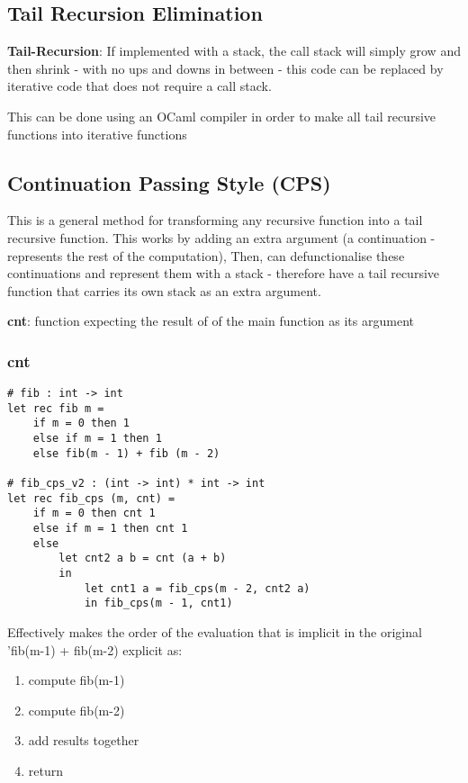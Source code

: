\documentclass{article}
\newenvironment{definition}{\par\color{blue}}{\par}
\begin{document}
\subsection{Tail Recursion Elimination}
\begin{definition}
	\textbf{Tail-Recursion}: If implemented with a stack, the call stack will simply grow and then shrink - with no ups and downs in between - this code can be replaced by iterative code that does not require a call stack. 
	
	This can be done using an OCaml compiler in order to make all tail recursive functions into iterative functions
\end{definition}
\subsection{Continuation Passing Style (CPS)}
This is a general method for transforming any recursive function into a tail recursive function. This works by adding an extra argument (a continuation - represents the rest of the computation), Then, can defunctionalise these continuations and represent them with a stack - therefore have a tail recursive function that carries its own stack as an extra argument.

\bigskip
\noindent
\textbf{cnt}: function expecting the result of of the main function as its argument

\subsubsection{cnt}
\begin{lstlisting}
# fib : int -> int 
let rec fib m = 
	if m = 0 then 1
	else if m = 1 then 1
	else fib(m - 1) + fib (m - 2)
	
# fib_cps_v2 : (int -> int) * int -> int 
let rec fib_cps (m, cnt) = 
	if m = 0 then cnt 1 
	else if m = 1 then cnt 1
	else 
		let cnt2 a b = cnt (a + b)
		in 
			let cnt1 a = fib_cps(m - 2, cnt2 a) 
			in fib_cps(m - 1, cnt1)
\end{lstlisting}

Effectively makes the order of the evaluation that is implicit in the original 'fib(m-1) + fib(m-2) explicit as:
\begin{enumerate}
	\item compute fib(m-1)
	\item compute fib(m-2)
	\item add results together
	\item return
\end{enumerate}
\end{document}
